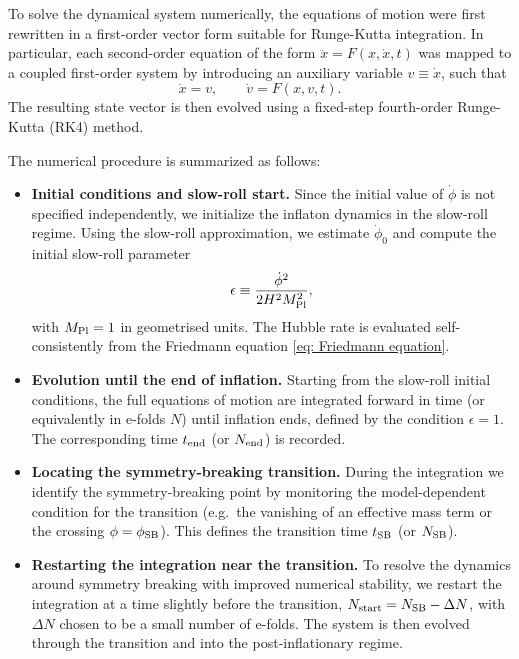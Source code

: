 To solve the dynamical system numerically, the equations of motion were first
rewritten in a first-order vector form suitable for Runge-Kutta integration.
In particular, each second-order equation of the form $\ddot{x}=F(x,\dot{x},t)$
was mapped to a coupled first-order system by introducing an auxiliary variable
$v\equiv \dot{x}$, such that
\begin{equation}
    \dot{x}=v,
    \qquad
    \dot{v}=F(x,v,t).
\end{equation}
The resulting state vector is then evolved using a fixed-step fourth-order
Runge-Kutta (RK4) method.

The numerical procedure is summarized as follows:

\begin{itemize}
    \item \textbf{Initial conditions and slow-roll start.}
    Since the initial value of $\dot{\phi}$ is not specified independently, we
    initialize the inflaton dynamics in the slow-roll regime.
    Using the slow-roll approximation, we estimate $\dot{\phi}_0$ and compute
    the initial slow-roll parameter
    \begin{equation}
        \epsilon \equiv \frac{\dot{\phi}^{2}}{2H^{2}M_{\rm Pl}^{2}},
    \end{equation}
    with $M_{\rm Pl}=1$ in geometrised units. The Hubble rate is evaluated self-consistently from the Friedmann equation \ref{eq: Friedmann equation}.

    \item \textbf{Evolution until the end of inflation.}
    Starting from the slow-roll initial conditions, the full equations of motion
    are integrated forward in time (or equivalently in e-folds $N$) until inflation
    ends, defined by the condition $\epsilon=1$. The corresponding time $t_{\rm end}$
    (or $N_{\rm end}$) is recorded.

    \item \textbf{Locating the symmetry-breaking transition.}
    During the integration we identify the symmetry-breaking point by monitoring
    the model-dependent condition for the transition (e.g.\ the vanishing of an
    effective mass term or the crossing $\phi=\phi_{\rm SB}$). This defines the
    transition time $t_{\rm SB}$ (or $N_{\rm SB}$).

    \item \textbf{Restarting the integration near the transition.}
    To resolve the dynamics around symmetry breaking with improved numerical
    stability, we restart the integration at a time slightly before the transition,
    $N_{\rm start}=N_{\rm SB}-\Delta N$, with $\Delta N$ chosen to be a small number
    of e-folds. The system is then evolved through the transition and into the
    post-inflationary regime.
\end{itemize}

